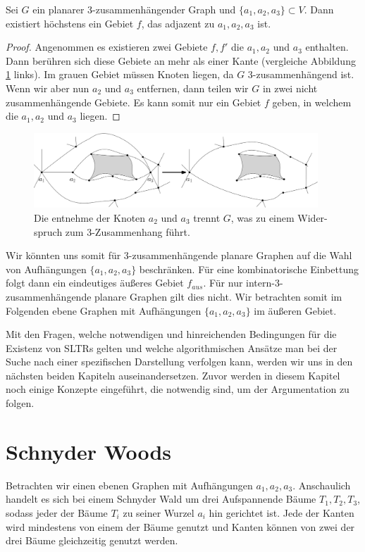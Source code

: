 \begin{proposition}
Sei $G$ ein planarer 3-zusammenhängender Graph und $\{a_1,a_2,a_3\} \subset V$. Dann existiert höchstens ein Gebiet $f$, das adjazent zu $a_1,a_2,a_3$ ist.
\end{proposition}

\begin{proof}
Angenommen es existieren zwei Gebiete $f,f'$ die $a_1,a_2$ und $a_3$ enthalten. Dann berühren sich diese Gebiete an mehr als einer Kante (vergleiche Abbildung \ref{3_con_uni} links). Im grauen Gebiet müssen Knoten liegen, da $G$ 3-zusammenhängend ist. Wenn wir aber nun $a_2$ und $a_3$ entfernen, dann teilen wir $G$ in zwei nicht zusammenhängende Gebiete. Es kann somit nur ein Gebiet $f$ geben, in welchem die $a_1,a_2$ und $a_3$ liegen.
\end{proof}

\begin{figure}
	\centering
  \includegraphics[width=0.95\textwidth]{3_conn_uni.png}
	\caption{Die entnehme der Knoten $a_2$ und $a_3$ trennt $G$, was zu einem Wider- spruch zum 3-Zusammenhang führt.}
	\label{3_con_uni}
\end{figure}

\begin{remark}
Wir könnten uns somit für 3-zusammenhängende planare Graphen auf die Wahl von Aufhängungen $\{a_1,a_2,a_3\}$ beschränken. Für eine kombinatorische Einbettung folgt dann ein eindeutiges äußeres Gebiet $f_{aus}$. Für nur intern-3-zusammenhängende planare Graphen gilt dies nicht. Wir betrachten somit im Folgenden ebene Graphen mit Aufhängungen $\{a_1,a_2,a_3\}$ im äußeren Gebiet.
\end{remark}

Mit den Fragen, welche notwendigen und hinreichenden Bedingungen für die Existenz von SLTRs gelten und welche algorithmischen Ansätze man bei der Suche nach einer spezifischen Darstellung verfolgen kann, werden wir uns in den nächsten beiden Kapiteln auseinandersetzen. Zuvor werden in diesem Kapitel noch einige Konzepte eingeführt, die notwendig sind, um der Argumentation zu folgen.

\section{Schnyder Woods}\label{sw}
Betrachten wir einen ebenen Graphen mit Aufhängungen $a_1,a_2,a_3$. Anschaulich handelt es sich bei einem Schnyder Wald um drei Aufspannende Bäume $T_1,T_2,T_3$, sodass jeder der Bäume $T_i$ zu seiner Wurzel $a_i$ hin gerichtet ist. Jede der Kanten wird mindestens von einem der Bäume genutzt und Kanten können von zwei der drei Bäume gleichzeitig genutzt werden.

